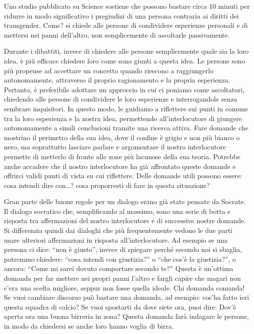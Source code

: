 \documentclass[12pt]{book} %
\begin{document}
Uno studio pubblicato su Science sostiene che
possono bastare circa 10 minuti per ridurre in modo significativo i pregiudizi di una persona contraria ai diritti dei transgender. Come? si chiede alle persone di condividere esperienze personali e di mettersi nei panni dell’altro, non semplicemente di ascoltarle passivamente.

Durante i dibattiti, invece di chiedere alle persone semplicemente quale sia la loro idea, è più efficace chiedere loro
come sono giunti a questa idea. Le persone sono più propense ad accettare un concetto quando riescono a raggiungerlo
autonomamente, attraverso il proprio ragionamento e la propria esperienza. Pertanto, è preferibile adottare un
approccio in cui ci poniamo come ascoltatori, chiedendo alle persone di condividere le loro esperienze e interrogandole
senza sembrare inquisitori. In questo modo, le guidiamo a riflettere sui punti in comune tra la loro esperienza e la
nostra idea, permettendo all'interlocutore di giungere autonomamente a simili conclusioni tramite una ricerca
attiva. Fare domande che mostrino il perimetro della sua idea, dove il confine è grigio e non più bianco o nero, ma
soprattutto lasciare parlare e argomentare il nostro interlocutore permette di metterlo di fronte alle zone più
lacunose della sua teoria. Potrebbe anche accadere che il
nostro interlocutore ha già affrontato queste domande e offrirci validi punti di vista su cui riflettere. Delle domande
utili possono essere: cosa intendi dire con…? cosa proporresti di fare in questa situazione?

Gran parte delle buone regole per un dialogo erano già state pensate da Socrate. Il dialogo socratico che, 
semplificando al massimo, sono una serie di botta e risposta tra affermazioni del nostro interlocutore e
di successive nostre domande. Si differenzia quindi dai dialoghi che più frequentemente vedono le due parti usare
ulteriori affermazioni in risposta all'interlocutore. Ad esempio se una persona ci dice: “non è
giusto”, invece di spiegare perché secondo noi si sbaglia, potremmo chiedere: “cosa intendi con giustizia?” o “che
cos'è la giustizia?”, o ancora: “Come mi sarei dovuto comportare secondo te?” Questa è
un'ottima domanda per far mettere nei propri panni l'altro e fargli capire
che magari non c'era una scelta migliore, seppur non fosse quella ideale.
Chi domanda comanda! Se vuoi cambiare discorso può bastare una domanda, ad esempio: cos'ha fatto ieri questa squadra di calcio?
Se vuoi spostarti da dove siete ora, puoi dire: Dov'è aperta ora una buona birreria in zona? Questa domanda farà indagare le persone, in modo da chiedersi se anche loro hanno voglia di birra.
\end{document}
